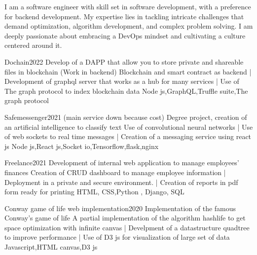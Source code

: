 \documentclass[9.5pt,a4paper,icons,colors]{Resume}
\begin{document}
\begin{paracol}{2}


I am a software engineer with skill set in software development, with a preference for backend development.
My expertise lies in tackling intricate challenges that demand optimization, algorithm development, and complex problem solving.
I am deeply passionate about embracing a DevOps mindset and cultivating a culture centered around it.




\cvproject
{Dochain}{2022}
{ }
{Develop of a DAPP that allow you to store private and shareable files in blockchain (Work in backend) }
{Blockchain and smart contract as backend |
Development of graphql server that works as a hub for many services |
Use of The graph protocol to index blockchain data} 
{Node js,GraphQL,Truffle suite,The graph protocol}

\divider

\cvproject
{Safemessenger}{2021}
{ (main service down because cost)}
{Degree project, creation of an artificial intelligence to classify text }
{Use of convolutional neural networks |
Use of web sockets to real time messages |
Creation of a messaging service using react js}
{Node js,React js,Socket io,Tensorflow,flask,nginx}
\divider

\cvproject
{Freelance}{2021}
{}
{Development of internal web application to manage employees' finances}
{Creation of CRUD dashboard to manage employee information | 
Deployment in a private and secure environment. |
Creation of reports in pdf form ready for printing}
{HTML, CSS,Python , Django, SQL}
\divider

\cvproject
{Conway game of life web implementation}{2020}
{}
{Implementation of the famous Conway's game of life}
{A partial implementation of the algorithm hashlife to get space optimization with infinite canvas |
Develpment of a datastructure quadtree to improve performance |
Use of D3 js for visualization of large set of data}
{Javascript,HTML canvas,D3 js}
\divider


\end{paracol}
\end{document}
